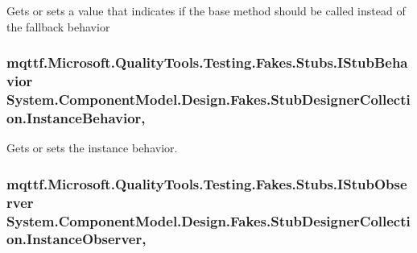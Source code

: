 Gets or sets a value that indicates if the base method should be called instead of the fallback behavior

\hypertarget{class_system_1_1_component_model_1_1_design_1_1_fakes_1_1_stub_designer_collection_a2330fcd06602f8375a79f522ff748c9f}{
\subsubsection[{Instance\-Behavior}]{\setlength{\rightskip}{0pt plus 5cm}mqttf.\-Microsoft.\-Quality\-Tools.\-Testing.\-Fakes.\-Stubs.\-I\-Stub\-Behavior System.\-Component\-Model.\-Design.\-Fakes.\-Stub\-Designer\-Collection.\-Instance\-Behavior\hspace{0.3cm}{\ttfamily [get]}, {\ttfamily [set]}}}\label{class_system_1_1_component_model_1_1_design_1_1_fakes_1_1_stub_designer_collection_a2330fcd06602f8375a79f522ff748c9f}


Gets or sets the instance behavior.

\hypertarget{class_system_1_1_component_model_1_1_design_1_1_fakes_1_1_stub_designer_collection_afd47350c0b37268c343f4cf79f105233}{
\subsubsection[{Instance\-Observer}]{\setlength{\rightskip}{0pt plus 5cm}mqttf.\-Microsoft.\-Quality\-Tools.\-Testing.\-Fakes.\-Stubs.\-I\-Stub\-Observer System.\-Component\-Model.\-Design.\-Fakes.\-Stub\-Designer\-Collection.\-Instance\-Observer\hspace{0.3cm}{\ttfamily [get]}, {\ttfamily [set]}}}\label{class_system_1_1_component_model_1_1_design_1_1_fakes_1_1_stub_designer_collection_afd47350c0b37268c343f4cf79f105233}


